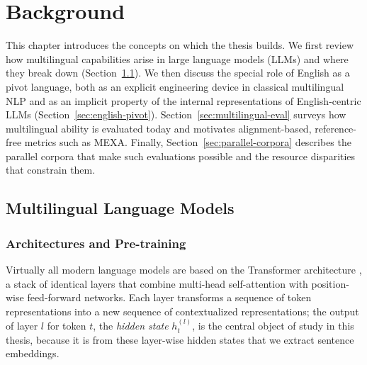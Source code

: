 %


\chapter{Background}
\label{ch:background}

This chapter introduces the concepts on which the thesis builds. We first
review how multilingual capabilities arise in large language models (LLMs)
and where they break down (Section~\ref{sec:multilingual-lms}). We then
discuss the special role of English as a pivot language, both as an explicit
engineering device in classical multilingual NLP and as an implicit property
of the internal representations of English-centric LLMs
(Section~\ref{sec:english-pivot}). Section~\ref{sec:multilingual-eval}
surveys how multilingual ability is evaluated today and motivates
alignment-based, reference-free metrics such as MEXA. Finally,
Section~\ref{sec:parallel-corpora} describes the parallel corpora that make
such evaluations possible and the resource disparities that constrain them.

\section{Multilingual Language Models}
\label{sec:multilingual-lms}

\subsection{Architectures and Pre-training}
\label{subsec:architectures}

Virtually all modern language models are based on the Transformer
architecture \citep{vaswani2017attention}, a stack of identical layers that
combine multi-head self-attention with position-wise feed-forward networks.
Each layer transforms a sequence of token representations into a new
sequence of contextualized representations; the output of layer $l$ for
token $t$, the \emph{hidden state} $h_t^{(l)}$, is the central object of
study in this thesis, because it is from these layer-wise hidden states
that we extract sentence embeddings.

